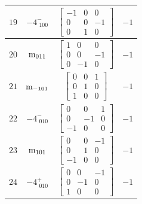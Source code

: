 \documentclass[fleqn,8pt]{jsarticle}
\begin{document}
\begin{longtable}{cccc}
$ 19 $ & $ -4^{-}_{\,\,100} $ & $ \begin{bmatrix} -1 & 0 & 0 \\ 0 & 0 & -1 \\ 0 & 1 & 0 \end{bmatrix} $ & $ -1 $ \\ \hline
$ 20 $ & $ {\rm m}_{011} $ & $ \begin{bmatrix} 1 & 0 & 0 \\ 0 & 0 & -1 \\ 0 & -1 & 0 \end{bmatrix} $ & $ -1 $ \\ \hline
$ 21 $ & $ {\rm m}_{-101} $ & $ \begin{bmatrix} 0 & 0 & 1 \\ 0 & 1 & 0 \\ 1 & 0 & 0 \end{bmatrix} $ & $ -1 $ \\ \hline
$ 22 $ & $ -4^{-}_{\,\,010} $ & $ \begin{bmatrix} 0 & 0 & 1 \\ 0 & -1 & 0 \\ -1 & 0 & 0 \end{bmatrix} $ & $ -1 $ \\ \hline
$ 23 $ & $ {\rm m}_{101} $ & $ \begin{bmatrix} 0 & 0 & -1 \\ 0 & 1 & 0 \\ -1 & 0 & 0 \end{bmatrix} $ & $ -1 $ \\ \hline
$ 24 $ & $ -4^{+}_{\,\,010} $ & $ \begin{bmatrix} 0 & 0 & -1 \\ 0 & -1 & 0 \\ 1 & 0 & 0 \end{bmatrix} $ & $ -1 $ \\
\end{longtable}
\end{document}
